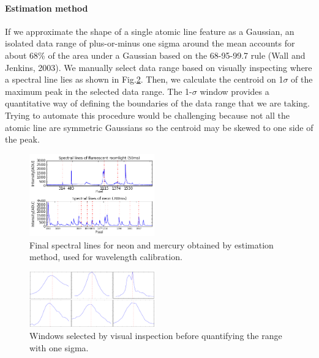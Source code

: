 \documentclass[authoryear, 12pt,5p, times]{elsarticle}
\newcommand{\rpm}{\raisebox{.2ex}{$\scriptstyle\pm$}}
\begin{document}
\paragraph*{\textbf{Estimation method}} 
If we approximate the shape of a single atomic line feature as a Gaussian, an isolated data range of plus-or-minus one sigma around the mean accounts for about 68\% of the area under a Gaussian based on the 68-95-99.7 rule (Wall and Jenkins, 2003).
We manually select data range based on visually inspecting where a spectral line lies as shown in Fig.\ref{window}. Then, we calculate the centroid on \large\rpm \normalsize 1$\sigma$ of the maximum peak in the selected data range. The 1-$\sigma$ window provides a quantitative way of defining the boundaries of the data range that we are taking. Trying to automate this procedure would be challenging because not all the atomic line are symmetric Gaussians so the centroid may be skewed to one side of the peak. 
\label{estimate-sec}
\begin{figure}
\includegraphics[width=0.48\textwidth]{figures/spectral_lines}
\caption{Final spectral lines for neon and mercury obtained by estimation method, used for wavelength calibration.}\label{final_lines}
\end{figure}
\begin{figure}
\includegraphics[width=0.48\textwidth]{figures/window}
\caption{Windows selected by visual inspection before quantifying the range with one sigma.}\label{window}
\end{figure}
\end{document}
